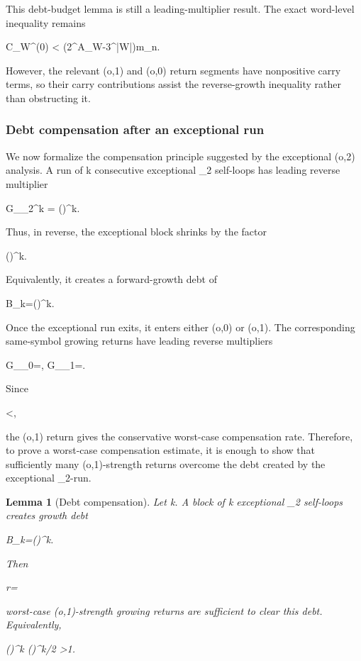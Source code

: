 \documentclass[11pt,letterpaper]{amsart}
\def\({}%
\def\){}%
\def\[{ }%
\def\]{ }%
\theoremstyle{definition}
\theoremstyle{plain}
\newtheorem{lemma}{Lemma}
\theoremstyle{plain}
\theoremstyle{remark}
\begin{document}
This debt-budget lemma is still a leading-multiplier result.  The exact
word-level inequality remains
\[
C_W^{(0)}
<
\left(2^{A_W}-3^{|W|}\right)m_n.
\]
However, the relevant \((o,1)\) and \((o,0)\) return segments have
nonpositive carry terms, so their carry contributions assist the
reverse-growth inequality rather than obstructing it.

\subsubsection{Debt compensation after an exceptional run}
\label{subsubsec:debt-compensation-lemma}

We now formalize the compensation principle suggested by the exceptional
\((o,2)\) analysis.  A run of \(k\) consecutive exceptional
\(\Omega_2\) self-loops has leading reverse multiplier
\[
G_{\Omega_2^k}
=
\left(\right)^k.
\]
Thus, in reverse, the exceptional block shrinks by the factor
\[
\left(\right)^k.
\]
Equivalently, it creates a forward-growth debt of
\[
B_k=\left(\right)^k.
\]

Once the exceptional run exits, it enters either \((o,0)\) or \((o,1)\).
The corresponding same-symbol growing returns have leading reverse
multipliers
\[
G_{\Omega_0}=,
\qquad
G_{\Omega_1}=.
\]
Since
\[
<,
\]
the \((o,1)\) return gives the conservative worst-case compensation
rate.  Therefore, to prove a worst-case compensation estimate, it is
enough to show that sufficiently many \((o,1)\)-strength returns
overcome the debt created by the exceptional \(\Omega_2\)-run.

\begin{lemma}[Debt compensation]
\label{lem:debt-compensation}
Let \(k\).  A block of \(k\) exceptional \(\Omega_2\) self-loops
creates growth debt
\[
B_k=\left(\right)^k.
\]
Then
\[
r=\left\lceil{}\right\rceil
\]
worst-case \((o,1)\)-strength growing returns are sufficient to clear
this debt.  Equivalently,
\[
\left(\right)^k
\left(\right)^{\lceil k/2\rceil}
>1.
\]
\end{lemma}
\end{document}
